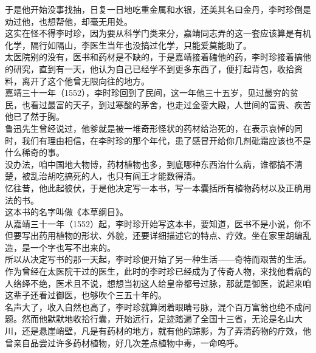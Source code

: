 \begin{multicols}{\theparacolNo}
于是他开始没事找抽，日复一日地吃重金属和水银，还美其名曰金丹，李时珍倒是劝过他，也想帮他，却毫无用处。\\

这实在怪不得李时珍，因为要从科学门类来分，嘉靖同志弄的这一套应该算是有机化学，隔行如隔山，李医生当年也没搞过化学，只能爱莫能助了。\\

太医院别的没有，医书和药材是不缺的，于是嘉靖接着磕他的药，李时珍接着搞他的研究，直到有一天，他认为自己已经学不到更多东西了，便打起背包，收拾资料，离开了这个他曾无限向往的地方。\\

嘉靖三十一年（1552），李时珍回到了民间，这一年他三十五岁，见过最穷的贫民，也看过最富的天子，到过寒酸的茅舍，也走过金銮大殿，人世间的富贵、疾苦他已了然于胸。\\

鲁迅先生曾经说过，他爹就是被一堆奇形怪状的药材给治死的，在表示哀悼的同时，我们有理由相信，在李时珍的那个年代，患了感冒开给你几剂砒霜应该也不是什么稀奇的事。\\

没办法，咱中国地大物博，药材植物也多，到底哪种东西治什么病，谁都搞不清楚，被乱治胡吃搞死的人，也只有阎王才能数得清。\\

忆往昔，他此起彼伏，于是他决定写一本书，写一本囊括所有植物药材以及正确用法的书。\\

这本书的名字叫做《本草纲目》。\\

从嘉靖三十一年（1552）起，李时珍开始写这本书，要知道，医书不是小说，你不但要写出药用植物的形状、外貌，还要详细描述它的特点、疗效。坐在家里胡编乱造，是一个字也写不出来的。\\

所以从决定写书的那一天起，李时珍便开始了另一种生活——奇特而艰苦的生活。\\

作为曾经在太医院干过的医生，此时的李时珍已经成为了传奇人物，来找他看病的人络绎不绝，医术且不说，想想当初这人给皇帝都号过脉，那就是御医，说起来咱这辈子还看过御医，也够吹个三五十年的。\\

名声大了，收入自然也高了，李时珍就算闭着眼睛号脉，混个百万富翁也绝不成问题。然而他默默地收拾行囊，开始远行，足迹踏遍了全国十三省，无论是名山大川，还是悬崖峭壁，凡是有药材的地方，就有他的踪影，为了弄清药物的疗效，他曾亲自品尝过许多药材植物，好几次差点植物中毒，一命呜呼。\\


\end{multicols}
